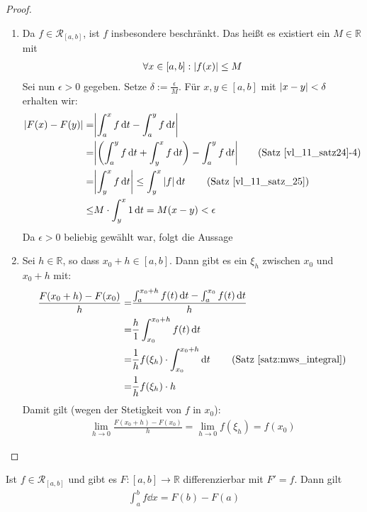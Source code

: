 \begin{proof}~
	\begin{enumerate}
		\item Da $f \in \mathcal{R}_{[a,b]}$, ist $f$ insbesondere beschränkt.
		Das heißt es existiert ein $M \in \mathbb{R}$ mit 
		\begin{align*}
			\forall x \in [a,b]:\abs{f(x)} \leq M
		\end{align*}
		Sei nun $\epsilon > 0$ gegeben. Setze $\delta := \frac{\epsilon}{M}$. 
		Für $x, y \in [a,b]$ mit $\abs{x-y} < \delta$ erhalten wir:
		\begin{align*}
			\abs{F(x) - F(y)} = & \abs{\int_a^x f \dd{t} - \int_a^y f \dd{t} }\\
			= &  \abs{ \left (\int_a^y f\dd{t} + \int_y^x f\dd{t} \right ) - \int_a^yf\dd{t}} \tag{Satz~\ref{vl_11_satz24}-4}\\
			= & \abs{\int_y^x f\dd{t}} \leq \int_y^x \abs{f} \dd{t} \tag{Satz~\ref{vl_11_satz_25}}\\
			\leq & M \cdot \int_y^x 1 \dd{t} = M (x-y) < \epsilon
		\end{align*}
		Da $\epsilon > 0$ beliebig gewählt war, folgt die Aussage
		\item Sei $h \in \mathbb{R}$, so dass $x_0 +h \in [a,b]$.
		Dann gibt es ein $\xi_h$ zwischen $x_0$ und $x_0+h$ mit:
		\begin{align*}
			\frac{F(x_0 + h) - F(x_0)}{h}
			= & \frac{ \int_a^{x_0+h}f(t)\dd{t}- \int_a^{x_0}f(t)\dd{t}}{h} \\
			= & \frac{h}{1} \int_{x_0}^{x_0+h} f(t)\dd{t} \\
			= & \frac{1}{h} f(\xi_h) \cdot \int_{x_0}^{x_0+h} \dd{t} \tag{Satz~\ref{satz:mws_integral}}\\
			= & \frac{1}{h} f(\xi_h) \cdot h
		\end{align*}
		 Damit gilt (wegen der Stetigkeit von $f$ in $x_0$):
		 \begin{align*}
		 \lim\limits_{h \rightarrow 0}{\frac{F(x_0+h)-F(x_0)}{h}} 
			= \lim\limits_{h \rightarrow 0} f(\xi_h) = f(x_0)
		 \end{align*}
	\end{enumerate}
\end{proof}


\begin{Satz}{\label{vl_12_satz_02}
	Ist $f \in \mathcal{R}_{[a,b]}$ und gibt es $F: [a,b] \rightarrow \mathbb{R}$
	differenzierbar mit $F' = f$. Dann gilt
	\begin{align*}
		\int_a^b f\dd{x} = F(b) - F(a) 
	\end{align*}
}\end{Satz}

